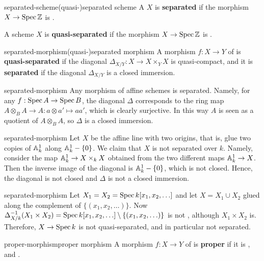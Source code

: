 \begin{topic}{separated-scheme}{(quasi-)separated scheme}
    A  $X$ is \textbf{separated} if the morphism $X \to \Spec \ZZ$ is .
    
    A scheme $X$ is \textbf{quasi-separated} if the morphism $X \to \Spec \ZZ$ is .
\end{topic}

\begin{topic}{separated-morphism}{(quasi-)separated morphism}
    A morphism $f : X \to Y$ of  is \textbf{quasi-separated} if the diagonal $\Delta_{X/Y} : X \to X \times_Y X$ is quasi-compact, and it is \textbf{separated} if the diagonal $\Delta_{X/Y}$ is a closed immersion.
\end{topic}

\begin{example}{separated-morphism}
    Any morphism of affine schemes is separated. Namely, for any $f : \Spec A \to \Spec B$, the diagonal $\Delta$ corresponds to the ring map $A \otimes_B A \to A : a \otimes a' \mapsto aa'$, which is clearly surjective. In this way $A$ is seen as a quotient of $A \otimes_B A$, so $\Delta$ is a closed immersion.
\end{example}

\begin{example}{separated-morphism}
    Let $X$ be the affine line with two origins, that is, glue two copies of $\AA_k^1$ along $\AA_k^1 - \{ 0 \}$. We claim that $X$ is not separated over $k$. Namely, consider the map $\AA^1_k \to X \times_k X$ obtained from the two different maps $\AA_k^1 \to X$. Then the inverse image of the diagonal is $\AA_k^1 - \{ 0 \}$, which is not closed. Hence, the diagonal is not closed and $\Delta$ is not a closed immersion.
\end{example}

\begin{example}{separated-morphism}
    Let $X_1 = X_2 = \Spec k[x_1, x_2, \ldots]$ and let $X = X_1 \cup X_2$ glued along the complement of $\{ (x_1, x_2, \ldots) \}$. Now $\Delta_{X/k}^{-1}(X_1 \times X_2) = \Spec k[x_1, x_2, \ldots] \setminus \{ (x_1, x_2, \ldots) \}$ is not , although $X_1 \times X_2$ is. Therefore, $X \to \Spec k$ is not quasi-separated, and in particular not separated.
\end{example}

\begin{topic}{proper-morphism}{proper morphism}
    A morphism $f : X \to Y$ of  is \textbf{proper} if it is ,  and .
\end{topic}

